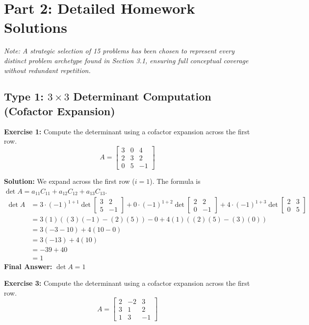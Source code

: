 \documentclass{article}
\begin{document}
\newpage
\section{Part 2: Detailed Homework Solutions}
\textit{Note: A strategic selection of 15 problems has been chosen to represent every distinct problem archetype found in Section 3.1, ensuring full conceptual coverage without redundant repetition.}

\subsection{Type 1: $3 \times 3$ Determinant Computation (Cofactor Expansion)}

\textbf{Exercise 1:} Compute the determinant using a cofactor expansion across the first row.
\[ A = \begin{bmatrix} 3 & 0 & 4 \\ 2 & 3 & 2 \\ 0 & 5 & -1 \end{bmatrix} \]

\textbf{Solution:}
We expand across the first row ($i=1$). The formula is $\det A = a_{11}C_{11} + a_{12}C_{12} + a_{13}C_{13}$.
\begin{align*}
\det A &= 3 \cdot (-1)^{1+1} \det \begin{bmatrix} 3 & 2 \\ 5 & -1 \end{bmatrix} + 0 \cdot (-1)^{1+2} \det \begin{bmatrix} 2 & 2 \\ 0 & -1 \end{bmatrix} + 4 \cdot (-1)^{1+3} \det \begin{bmatrix} 2 & 3 \\ 0 & 5 \end{bmatrix} \\
&= 3(1)((3)(-1) - (2)(5)) - 0 + 4(1)((2)(5) - (3)(0)) \\
&= 3(-3 - 10) + 4(10 - 0) \\
&= 3(-13) + 4(10) \\
&= -39 + 40 \\
&= 1
\end{align*}
\textbf{Final Answer:} $\det A = 1$

\vspace{0.5cm}
\textbf{Exercise 3:} Compute the determinant using a cofactor expansion across the first row.
\[ A = \begin{bmatrix} 2 & -2 & 3 \\ 3 & 1 & 2 \\ 1 & 3 & -1 \end{bmatrix} \]
\end{document}
